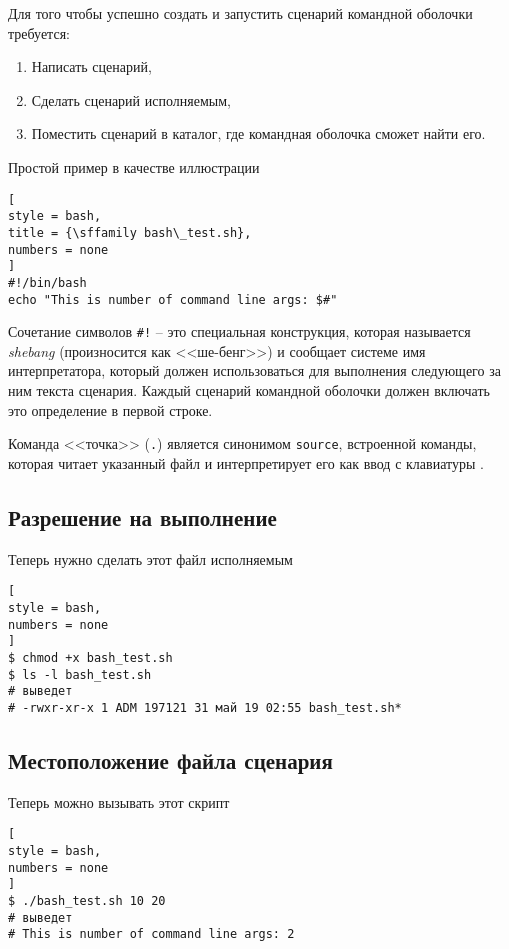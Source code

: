 \documentclass[%
	11pt,
	a4paper,
	utf8,
		]{article}
\begin{document}
Для того чтобы успешно создать и запустить сценарий командной оболочки требуется:
\begin{enumerate}
	\item Написать сценарий,
	
	\item Сделать сценарий исполняемым,
	
	\item Поместить сценарий в каталог, где командная оболочка сможет найти его.
\end{enumerate}

Простой пример в качестве иллюстрации
\begin{lstlisting}[
style = bash,
title = {\sffamily bash\_test.sh},
numbers = none
]
#!/bin/bash
echo "This is number of command line args: $#"
\end{lstlisting}

Сочетание символов \verb|#!| -- это специальная конструкция, которая называется \emph{shebang} (произносится как <<ше-бенг>>) и сообщает системе имя интерпретатора, который должен использоваться для выполнения следующего за ним текста сценария. Каждый сценарий командной оболочки должен включать это определение в первой строке.

Команда <<точка>> (\texttt{.}) является синонимом \texttt{source}, встроенной команды, которая читает указанный файл и интерпретирует его как ввод с клавиатуры \cite[]{shotts:linux-2017}.

\subsection{Разрешение на выполнение}

Теперь нужно сделать этот файл исполняемым
\begin{lstlisting}[
style = bash,
numbers = none
]
$ chmod +x bash_test.sh
$ ls -l bash_test.sh
# выведет
# -rwxr-xr-x 1 ADM 197121 31 май 19 02:55 bash_test.sh*
\end{lstlisting}

\subsection{Местоположение файла сценария}

Теперь можно вызывать этот скрипт
\begin{lstlisting}[
style = bash,
numbers = none
]
$ ./bash_test.sh 10 20
# выведет
# This is number of command line args: 2
\end{lstlisting}
\end{document}
